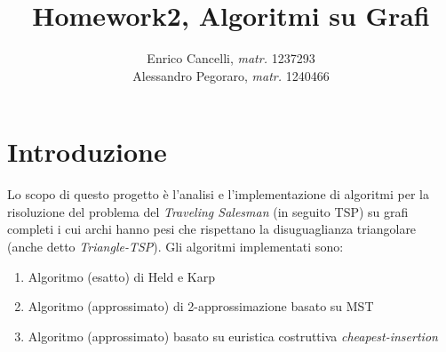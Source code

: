 \documentclass[]{article}
\title{Homework2, Algoritmi su Grafi}
\author{Enrico Cancelli, \textit{matr.} 1237293\\
	Alessandro Pegoraro, \textit{matr.} 1240466}
\begin{document}
\maketitle

\begin{abstract}

\end{abstract}

\section{Introduzione}
Lo scopo di questo  progetto è l'analisi e l'implementazione di algoritmi per la risoluzione del problema del \textit{Traveling Salesman} (in seguito TSP) su grafi completi i cui archi hanno pesi che rispettano la disuguaglianza triangolare (anche detto \textit{Triangle-TSP}).
Gli algoritmi implementati sono:
\begin{enumerate}
	\item Algoritmo (esatto) di Held e Karp
	\item Algoritmo (approssimato) di 2-approssimazione basato su MST
	\item Algoritmo (approssimato) basato su euristica costruttiva \textit{cheapest-insertion}
\end{enumerate}
\end{document}

